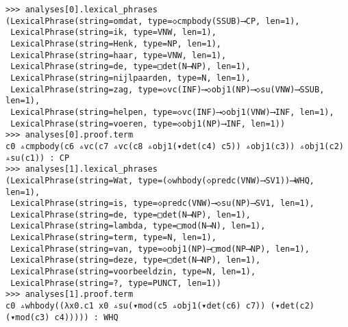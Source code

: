\begin{verbatim}
>>> analyses[0].lexical_phrases
(LexicalPhrase(string=omdat, type=◇cmpbody(SSUB)⟶CP, len=1),
 LexicalPhrase(string=ik, type=VNW, len=1),
 LexicalPhrase(string=Henk, type=NP, len=1),
 LexicalPhrase(string=haar, type=VNW, len=1),
 LexicalPhrase(string=de, type=□det(N⟶NP), len=1),
 LexicalPhrase(string=nijlpaarden, type=N, len=1),
 LexicalPhrase(string=zag, type=◇vc(INF)⟶◇obj1(NP)⟶◇su(VNW)⟶SSUB, len=1),
 LexicalPhrase(string=helpen, type=◇vc(INF)⟶◇obj1(VNW)⟶INF, len=1),
 LexicalPhrase(string=voeren, type=◇obj1(NP)⟶INF, len=1))
>>> analyses[0].proof.term
c0 ▵cmpbody(c6 ▵vc(c7 ▵vc(c8 ▵obj1(▾det(c4) c5)) ▵obj1(c3)) ▵obj1(c2) ▵su(c1)) : CP
>>> analyses[1].lexical_phrases
(LexicalPhrase(string=Wat, type=(◇whbody(◇predc(VNW)⟶SV1))⟶WHQ, len=1),
 LexicalPhrase(string=is, type=◇predc(VNW)⟶◇su(NP)⟶SV1, len=1),
 LexicalPhrase(string=de, type=□det(N⟶NP), len=1),
 LexicalPhrase(string=lambda, type=□mod(N⟶N), len=1),
 LexicalPhrase(string=term, type=N, len=1),
 LexicalPhrase(string=van, type=◇obj1(NP)⟶□mod(NP⟶NP), len=1),
 LexicalPhrase(string=deze, type=□det(N⟶NP), len=1),
 LexicalPhrase(string=voorbeeldzin, type=N, len=1),
 LexicalPhrase(string=?, type=PUNCT, len=1))
>>> analyses[1].proof.term
c0 ▵whbody((λx0.c1 x0 ▵su(▾mod(c5 ▵obj1(▾det(c6) c7)) (▾det(c2) (▾mod(c3) c4))))) : WHQ
\end{verbatim}


